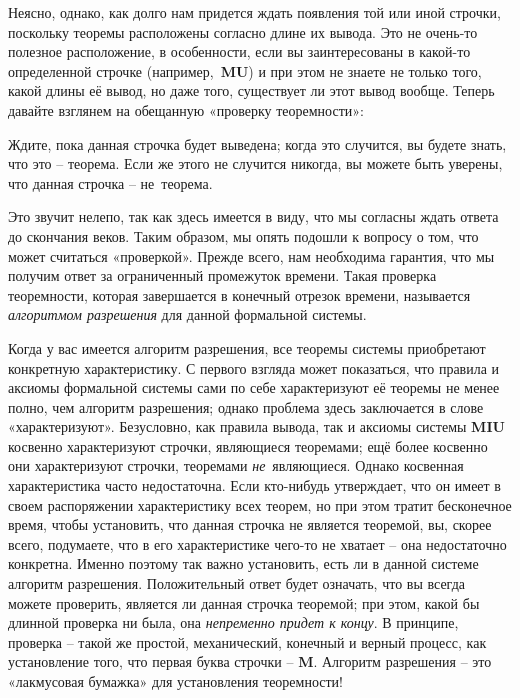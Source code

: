 \documentclass[../main.tex]{subfiles}
\begin{document}

Неясно, однако, как долго нам придется ждать появления той или иной строчки, поскольку теоремы расположены согласно длине их вывода. Это не очень-то полезное расположение, в особенности, если вы заинтересованы в какой-то определенной строчке (например,~\textbf{MU}) и при этом не знаете не только того, какой длины её вывод, но даже того, существует ли этот вывод вообще. Теперь давайте взглянем на обещанную «проверку теоремности»:

Ждите, пока данная строчка будет выведена; когда это случится, вы будете знать, что это \--- теорема. Если же этого не случится никогда, вы можете быть уверены, что данная строчка \--- не~теорема.

Это звучит нелепо, так как здесь имеется в виду, что мы согласны ждать ответа до скончания веков. Таким образом, мы опять подошли к вопросу о том, что может считаться «проверкой». Прежде всего, нам необходима гарантия, что мы получим ответ за ограниченный промежуток времени. Такая проверка теоремности, которая завершается в конечный отрезок времени, называется \emph{алгоритмом разрешения} для данной формальной системы.

Когда у вас имеется алгоритм разрешения, все теоремы системы приобретают конкретную характеристику. С первого взгляда может показаться, что правила и аксиомы формальной системы сами по себе характеризуют её теоремы не менее полно, чем алгоритм разрешения; однако проблема здесь заключается в слове «характеризуют». Безусловно, как правила вывода, так и аксиомы системы \textbf{MIU} косвенно характеризуют строчки, являющиеся теоремами; ещё более косвенно они характеризуют строчки, теоремами \emph{не}~являющиеся. Однако косвенная характеристика часто недостаточна. Если кто-нибудь утверждает, что он имеет в своем распоряжении характеристику всех теорем, но при этом тратит бесконечное время, чтобы установить, что данная строчка не является теоремой, вы, скорее всего, подумаете, что в его характеристике чего-то не хватает \--- она недостаточно конкретна. Именно поэтому так важно установить, есть ли в данной системе алгоритм разрешения. Положительный ответ будет означать, что вы всегда можете проверить, является ли данная строчка теоремой; при этом, какой бы длинной проверка ни была, она \emph{непременно придет к концу}. В принципе, проверка \--- такой же простой, механический, конечный и верный процесс, как установление того, что первая буква строчки \--- \textbf{M}. Алгоритм разрешения \--- это «лакмусовая бумажка» для установления теоремности!
\end{document}
